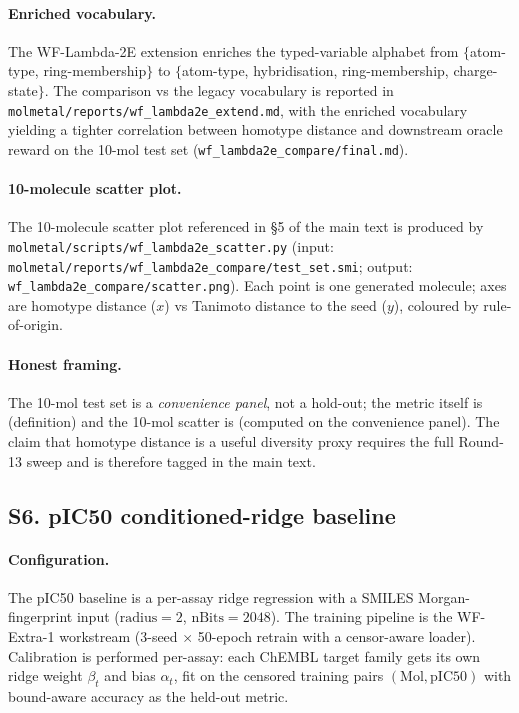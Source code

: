 \paragraph{Enriched vocabulary.}
The WF-Lambda-2E extension enriches the typed-variable alphabet from
$\{$atom-type, ring-membership$\}$ to
$\{$atom-type, hybridisation, ring-membership, charge-state$\}$.  The
comparison vs the legacy vocabulary is reported in
\texttt{molmetal/reports/wf\_lambda2e\_extend.md}, with the enriched
vocabulary yielding a tighter correlation between homotype distance
and downstream oracle reward on the 10-mol test set
(\texttt{wf\_lambda2e\_compare/final.md}).

\paragraph{10-molecule scatter plot.}
The 10-molecule scatter plot referenced in \S5 of the main text is
produced by \texttt{molmetal/scripts/wf\_lambda2e\_scatter.py} (input:
\texttt{molmetal/reports/wf\_lambda2e\_compare/test\_set.smi};
output: \texttt{wf\_lambda2e\_compare/scatter.png}).  Each point is one
generated molecule; axes are homotype distance ($x$) vs Tanimoto
distance to the seed ($y$), coloured by rule-of-origin.

\paragraph{Honest framing.}
The 10-mol test set is a \emph{convenience panel}, not a hold-out; the
metric itself is \DESIGN{} (definition) and the 10-mol scatter is
\MEASURED{} (computed on the convenience panel).  The claim that
homotype distance is a useful diversity proxy requires the full
Round-13 sweep and is therefore tagged \DESIGN{} in the main text.


\subsection*{S6. pIC50 conditioned-ridge baseline}
\label{supp:s6-pic50}

\paragraph{Configuration.}
The pIC50 baseline is a per-assay ridge regression with a SMILES
Morgan-fingerprint input ($\text{radius}=2$, $\text{nBits}=2048$).  The
training pipeline is the WF-Extra-1 workstream
\cite{footnote:wf_extra1_full} (3-seed $\times$ 50-epoch retrain with
a censor-aware loader).  Calibration is performed per-assay: each
ChEMBL target family gets its own ridge weight $\beta_t$ and bias
$\alpha_t$, fit on the censored training pairs
$(\text{Mol}, \text{pIC50})$ with bound-aware accuracy as the held-out
metric.

